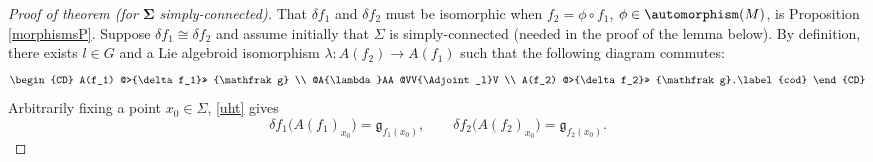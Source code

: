 %
\begin{proof}[Proof of theorem (for $\boldsymbol{\Sigma}$ simply-connected)] That
$\delta f_1$ and $\delta f_2$ must be isomorphic when $f_2 = \phi
\circ f_1 $, $\phi \in \automorphism(M)$, is Proposition
\ref{morphismsP}. Suppose $\delta f_1 \cong\delta f_2$ and assume
initially that $\Sigma $ is simply-connected (needed in the proof of
the lemma below). By definition, there exists $l \in G$ and a Lie
algebroid isomorphism $\lambda \colon A(f_2) \rightarrow A(f_1)$ such
that the following diagram commutes:
\begin{gather}
 \begin{CD} A(f_1) @>{\delta f_1}>> {\mathfrak g} \\ @A{\lambda}AA
@VV{\Adjoint_l}V \\ A(f_2) @>{\delta f_2}>> {\mathfrak g}.\label{cod}
 \end{CD}
\end{gather}
Arbitrarily fixing a point $x_0 \in \Sigma$,
\eqref{uht} gives
\begin{equation}
\delta f_1\big(A(f_1)_{x_0}\big) = {\mathfrak g}_{f_1(x_0)},\qquad
\delta f_2\big(A(f_2)_{x_0}\big) = {\mathfrak g}_{f_2(x_0)}.\label{hws}
\end{equation}


\end{proof}

